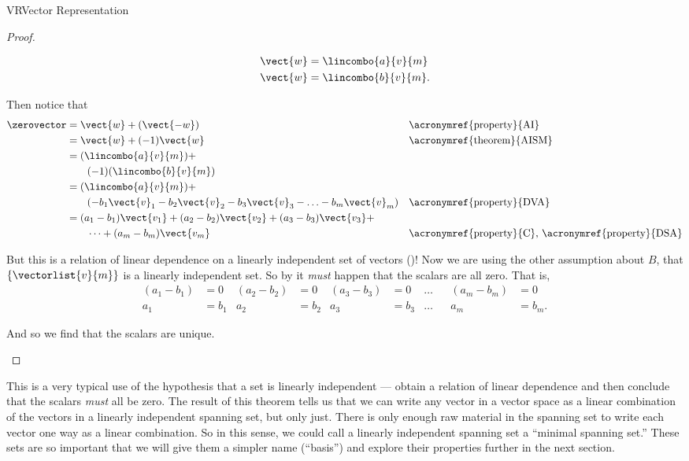 \begin{subsect}{VR}{Vector Representation}
\begin{proof}
\begin{para}
%
\begin{align*}
\vect{w}&=\lincombo{a}{v}{m}\\
\vect{w}&=\lincombo{b}{v}{m}.
\end{align*}\end{para}
%
\begin{para}Then notice that
%
\begin{align*}
\zerovector
&=\vect{w}+(\vect{-w})&&\text{\acronymref{property}{AI}}\\
%
&=\vect{w}+(-1)\vect{w}&&\text{\acronymref{theorem}{AISM}}\\
%
&=(\lincombo{a}{v}{m})+\\
&\quad\quad(-1)(\lincombo{b}{v}{m})\\
%
&=(\lincombo{a}{v}{m})+\\
&\quad\quad (-b_1\vect{v}_1-b_2\vect{v}_2-b_3\vect{v}_3-\ldots-b_m\vect{v}_m)&&\text{\acronymref{property}{DVA}}\\
%
&=(a_1-b_1)\vect{v_1}+(a_2-b_2)\vect{v_2}+(a_3-b_3)\vect{v_3}+\\
&\quad\quad\cdots+(a_m-b_m)\vect{v_m}&&\text{\acronymref{property}{C}, \acronymref{property}{DSA}}
\end{align*}
\end{para}
%
\begin{para}But this is a relation of linear dependence on a linearly independent set of vectors ()! Now we are using the other assumption about $B$, that $\{\vectorlist{v}{m}\}$ is a linearly independent set.   So by  it {\em must} happen that the scalars are all zero.  That is,
%
\begin{align*}
(a_1-b_1)&=0&(a_2-b_2)&=0&(a_3-b_3)&=0&\ldots&&(a_m-b_m)&=0\\
a_1&=b_1&a_2&=b_2&a_3&=b_3&\ldots&&a_m&=b_m.
\end{align*}
\end{para}
%
\begin{para}And so we find that the scalars are unique.\end{para}
%
\end{proof}
%
\begin{para}This is a very typical use of the hypothesis that a set is linearly independent --- obtain a relation of linear dependence and then conclude that the scalars {\em must} all be zero.  The result of this theorem tells us that we can write any vector in a vector space as a linear combination of the vectors in a linearly independent spanning set, but only just.  There is only enough raw material in the spanning set to write each vector one way as a linear combination.  So in this sense, we could call a linearly independent spanning set a ``minimal spanning set.''  These sets are so important that we will give them a simpler name (``basis'') and explore their properties further in the next section.\end{para}
%
\end{subsect}
%
